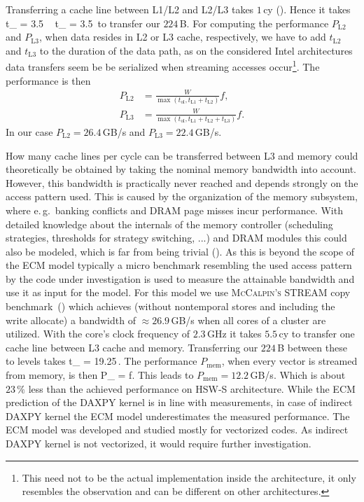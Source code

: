 Transferring a cache line between L1/L2 and L2/L3 takes $1$\,cy (\cite{intel-orm-2016}). Hence it takes
%
\be
  t_ = 3.5\,\cyw\ \ t_ = 3.5\,\cyw
\ee
%
to transfer our $224$\,B.
For computing the performance $P_\text{L2}$ and $P_\text{L3}$, when data resides
in L2 or L3 cache, respectively, we
have to add $t_\text{L2}$ and $t_\text{L3}$ to the duration of the data path, as on the considered
Intel architectures data transfers seem be be serialized when streaming accesses
occur\footnote{This need not to be the actual implementation inside the
architecture, it only resembles the observation and can be different on other
architectures.}.
The performance is then
%
\begin{align}
  P_\text{L2} &= \frac{W}{\max(t_\text{ol}, t_\text{L1} + t_\text{L2})} f, \\
  P_\text{L3} &= \frac{W}{\max(t_\text{ol}, t_\text{L1} + t_\text{L2} +
t_\text{L3})} f.
\end{align}
%
In our case $P_\text{L2} = 26.4$\,GB/s and $P_\text{L3} = 22.4$\,GB/s.
%

How many cache lines per cycle can be transferred between L3 and memory could
theoretically be obtained by taking the nominal memory bandwidth into account.
However, this bandwidth is practically never reached and depends strongly on the
access pattern used.
This is caused by the organization of the memory subsystem, where e.\,g.\ banking
conflicts and DRAM page misses incur performance.
With detailed knowledge about the internals of the memory controller
(scheduling strategies, thresholds for strategy switching, ...) and DRAM modules
this could also be modeled, which is far from being trivial (\cite{jacob-2007}).
As this is beyond the scope of the ECM model typically a micro benchmark
resembling the used access pattern by the code under investigation is used
to measure the attainable bandwidth and use it as input for the model.
%
For this model we use \textsc{McCalpin's} STREAM copy
benchmark~(\cite{mccalpin-1995}) which achieves (without nontemporal stores and
including the write allocate) a bandwidth of $\approx 26.9$\,GB/s when all cores
of a cluster are utilized.
With the core's clock frequency of $2.3$\,GHz it takes $5.5$\,cy to transfer one
cache line between L3 cache and memory.
Transferring our $224$\,B between these to levels takes
%
\be
  t_ = 19.25\,\cyw.
\ee
%
The performance $P_\text{mem}$, when every vector is streamed from memory, is then
%
\be
  P_ =  f.
\ee
%
This leads to $P_\text{mem} = 12.2$\,GB/s. 
{\color{blue} Which is about $23\,\%$ less than the achieved performance on HSW-S architecture. While the ECM prediction of the DAXPY kernel is in line with measurements, in case of indirect DAXPY kernel the ECM model underestimates the measured performance. The ECM model was developed and studied mostly for vectorized codes. As indirect DAXPY kernel is not vectorized, it would require further investigation.}

